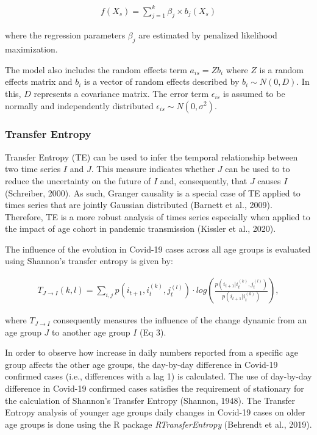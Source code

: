 \documentclass[]{elsarticle} %
\begin{document}
\begin{align}
f(X_{s})=\sum_{j=1}^{k}\beta_{j}\times b_{j}(X_{s})
\end{align}

\noindent where the regression parameters \(\beta_{j}\) are estimated by penalized likelihood maximization.

The model also includes the random effects term \(a_{is}= Zb_{i}\) where \(Z\) is a random effects matrix and \(b_{i}\) is a vector of random effects described by \(b_{i} \sim N(0, D)\). In this, \(D\) represents a covariance matrix. The error term \(\epsilon_{is}\) is assumed to be normally and independently distributed \(\epsilon_{is} \sim N(0, \sigma^2)\).

\hypertarget{transfer-entropy}{%
\subsubsection{Transfer Entropy}\label{transfer-entropy}}

Transfer Entropy (TE) can be used to infer the temporal relationship between two time series \(I\) and \(J\). This measure indicates whether \(J\) can be used to to reduce the uncertainty on the future of \(I\) and, consequently, that \(J\) causes \(I\) (Schreiber, 2000). As such, Granger causality is a special case of TE applied to times series that are jointly Gaussian distributed (Barnett et al., 2009). Therefore, TE is a more robust analysis of times series especially when applied to the impact of age cohort in pandemic transmission (Kissler et al., 2020).

The influence of the evolution in Covid-19 cases across all age groups is evaluated using Shannon's transfer entropy is given by:

\begin{align}
  T_{J \rightarrow I}(k,l) = \sum_{i,j} p\left(i_{t+1}, i_t^{(k)}, j_t^{(l)}\right) \cdot log \left(\frac{p\left(i_{t+1}| i_t^{(k)}, j_t^{(l)}\right)}{p\left(i_{t+1}|i_t^{(k)}\right)}\right),
\end{align}

\noindent where \(T_{J\rightarrow I}\) consequently measures the influence of the change dynamic from an age group \(J\) to another age group \(I\) (Eq 3).

In order to observe how increase in daily numbers reported from a specific age group affects the other age groups, the day-by-day difference in Covid-19 confirmed cases (i.e., differences with a lag 1) is calculated. The use of day-by-day difference in Covid-19 confirmed cases satisfies the requirement of stationary for the calculation of Shannon's Transfer Entropy (Shannon, 1948). The Transfer Entropy analysis of younger age groups daily changes in Covid-19 cases on older age groups is done using the R package \emph{RTransferEntropy} (Behrendt et al., 2019).
\end{document}
